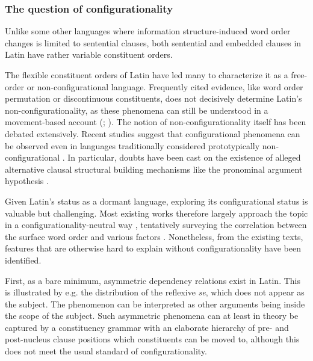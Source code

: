 \documentclass[a4paper, oneside, 12pt]{report}
\newcommand*{\citepages}[1]{pp.~{#1}}
\newcommand{\form}[1]{\emph{#1}}
\begin{document}
\subsubsection{The question of configurationality}\label{sec:grammatical.clause.configurational}

Unlike some other languages where information structure-induced word order changes is limited to sentential clauses, 
both sentential and embedded clauses in Latin have rather variable constituent orders.

The flexible constituent orders of Latin 
have led many to characterize it as a free-order or non-configurational language.
Frequently cited evidence, like word order permutation or discontinuous constituents,
does not decisively determine Latin's non-configurationality,
as these phenomena can still be understood in a movement-based account (\citealt[\citepages{73-75}]{danckaert2017development}; \citealt[\citepages{524-611}]{devine2006latin}).
The notion of non-configurationality itself has been debated extensively.
Recent studies suggest that configurational phenomena can be observed even in languages traditionally considered prototypically non-configurational \citep[among others]{niedzielski2017clausal,morris2018evidence,legate2002warlpiri}.
In particular, doubts have been cast on the existence of alleged alternative clausal structural building mechanisms like the pronominal argument hypothesis \citep{legate2002warlpiri}.

Given Latin's status as a dormant language, exploring its configurational status is valuable but challenging.
Most existing works therefore largely approach the topic in a configurationality-neutral way 
\citep[\citepages{9-12}]{danckaert2017development},
tentatively surveying the correlation between the surface word order and various factors \citep[\citepages{948-967}]{pinkster2}.
Nonetheless, from the existing texts, features that are otherwise hard to explain without configurationality have been identified.

First, as a bare minimum, asymmetric dependency relations exist in Latin. 
This is illustrated by e.g. the distribution of the reflexive \form{se},
which does not appear as the subject.
The phenomenon can be interpreted as other arguments being inside the scope of the subject.
Such asymmetric phenomena can at least in theory be captured by a constituency grammar with an elaborate hierarchy of pre- and post-nucleus clause positions which constituents can be moved to,
although this does not meet the usual standard of configurationality.
\end{document}

